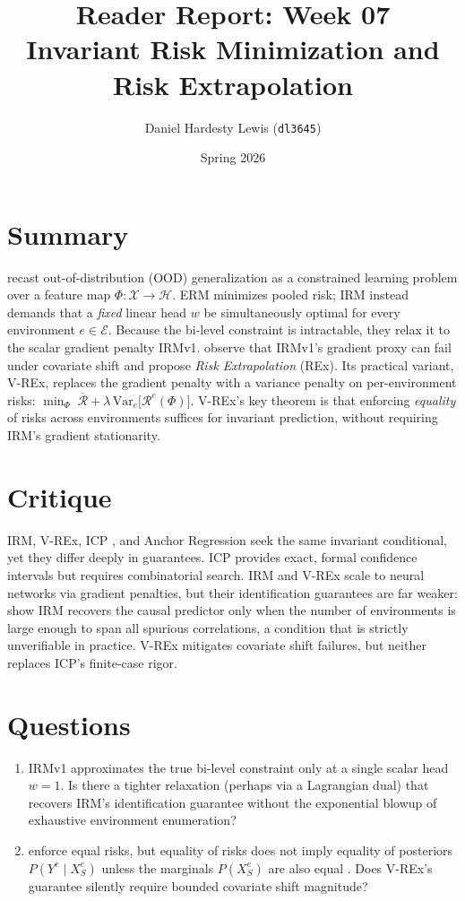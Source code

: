 \documentclass[11pt,twoside]{article}
\title{\textbf{Reader Report: Week 07}\\ \large Invariant Risk Minimization and Risk Extrapolation}
\author{Daniel Hardesty Lewis (\texttt{dl3645})}
\date{Spring 2026}
\begin{document}
\maketitle
\thispagestyle{fancy}

\section*{Summary}
\citet{arjovsky2019irm} recast out-of-distribution (OOD) generalization as a constrained learning problem over a feature map $\Phi:\mathcal{X}\!\to\!\mathcal{H}$. ERM minimizes pooled risk; IRM instead demands that a \emph{fixed} linear head $w$ be simultaneously optimal for every environment $e\in\mathcal{E}$. Because the bi-level constraint is intractable, they relax it to the scalar gradient penalty IRMv1. \citet{krueger2021rex} observe that IRMv1's gradient proxy can fail under covariate shift and propose \emph{Risk Extrapolation} (REx). Its practical variant, V-REx, replaces the gradient penalty with a variance penalty on per-environment risks: $\min_{\Phi}\;\overline{\mathcal{R}} + \lambda\,\mathrm{Var}_{e}\bigl[\mathcal{R}^e(\Phi)\bigr]$. V-REx's key theorem is that enforcing \emph{equality} of risks across environments suffices for invariant prediction, without requiring IRM's gradient stationarity.

\section*{Critique}
IRM, V-REx, ICP \citep{peters2016icp}, and Anchor Regression \citep{rothenhausler2021anchor} seek the same invariant conditional, yet they differ deeply in guarantees. ICP provides exact, formal confidence intervals but requires combinatorial search. IRM and V-REx scale to neural networks via gradient penalties, but their identification guarantees are far weaker: \citet{arjovsky2019irm} show IRM recovers the causal predictor only when the number of environments is large enough to span all spurious correlations, a condition that is strictly unverifiable in practice. V-REx mitigates covariate shift failures, but neither replaces ICP's finite-case rigor.

\section*{Questions}
\begin{enumerate}
    \item IRMv1 approximates the true bi-level constraint only at a single scalar head $w{=}1$. Is there a tighter relaxation (perhaps via a Lagrangian dual) that recovers IRM's identification guarantee without the exponential blowup of exhaustive environment enumeration?
    \item \citet{krueger2021rex} enforce equal risks, but equality of risks does not imply equality of posteriors $P(Y^e\!\mid\! X^e_S)$ unless the marginals $P(X^e_S)$ are also equal \citep{buhlmann2020invariance}. Does V-REx's guarantee silently require bounded covariate shift magnitude?
\end{enumerate}
\end{document}
